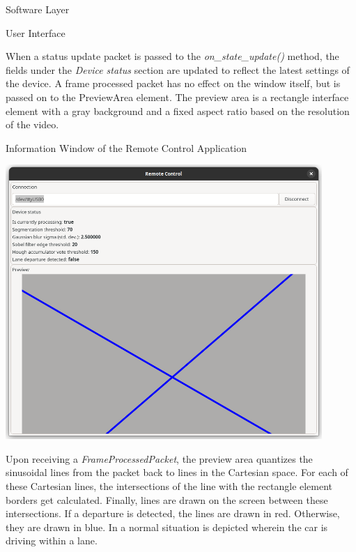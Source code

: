 \documentclass{matthijs}
\begin{document}
\begin{hoofdstuk}{Software Layer}
\begin{paragraaf}{User Interface}
			\clearpage

			When a status update packet is passed to the \textit{on\_state\_update(\textellipsis)} method, the fields under the \textit{Device status} section are updated to reflect the latest settings of the device.
			A frame processed packet has no effect on the window itself, but is passed on to the PreviewArea element.
			The preview area is a rectangle interface element with a gray background and a fixed aspect ratio based on the resolution of the video.
			
			\vspace{-0.5ex}
			\begin{figuur}{Information Window of the Remote Control Application}
				\singlespacing
				\centerline{
					\includegraphics[width=0.9\textwidth]{rc-gui.png}
				}
				\onehalfspacing
			\end{figuur}

			Upon receiving a \textit{FrameProcessedPacket}, the preview area quantizes the sinusoidal lines from the packet back to lines in the Cartesian space.
			For each of these Cartesian lines, the intersections of the line with the rectangle element borders get calculated.
			Finally, lines are drawn on the screen between these intersections.
			If a departure is detected, the lines are drawn in red.
			Otherwise, they are drawn in blue.
			In  a normal situation is depicted wherein the car is driving within a lane.

		\end{paragraaf}


\end{hoofdstuk}
\end{document}
